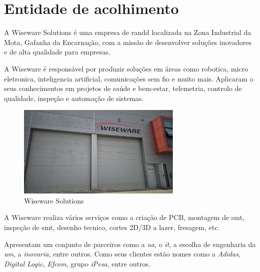 \chapter{Entidade de acolhimento}%
\label{chapter:entidade}

A Wiseware Solutions é uma empresa de \acs{randd} localizada na Zona Industrial da Mota, Gafanha da Encarnação, com a missão de desenvolver soluções inovadores e de alta qualidade para empresas.

A Wiseware é responsável por produzir soluções em áreas como robotica, micro eletronica, inteligencia artificial, comunicações sem fio e muito mais. Aplicaram o seus conhecimentos em projetos de saúde e bem-estar, telemetria, controlo de qualidade, inspeção e automação de sistemas.

\begin{figure}[h!]
	\centering
    \includegraphics[width=0.7\textwidth]{figs/wiseware2.jpg}
    \caption{Wiseware Solutions}
    \label{fig:company}
\end{figure}

A Wiseware realiza vários serviços como a criação de PCB, montagem de \acs{smt}, inspeção de \acs{smt}, desenho tecnico, cortes 2D/3D a lazer, fresagem, etc.

Apresentam um conjunto de parceiros como a \textit{\ac{ua}}, o \textit{\ac{it}}, a escolha de engenharia da \textit{\ac{um}}, a \textit{inovaria}, entre outros. Como seus clientes estão nomes como a \textit{Adidas}, \textit{Digital Logic}, \textit{Efcom}, grupo \textit{iPesa}, entre outros.